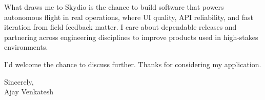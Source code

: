 \documentclass[letterpaper,11pt]{article}
\begin{document}
What draws me to Skydio is the chance to build software that powers autonomous flight in real operations, where UI quality, API reliability, and fast iteration from field feedback matter. I care about dependable releases and partnering across engineering disciplines to improve products used in high-stakes environments.

I'd welcome the chance to discuss further. Thanks for considering my application.

\vspace{12pt}
Sincerely, \\
Ajay Venkatesh
\end{document}
